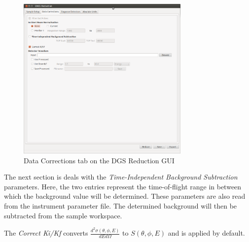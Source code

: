 \begin{figure}[ht]
\centerline{\includegraphics[width=0.75\textwidth]{figures/DataCorrections.png}}
\caption{Data Corrections tab on the DGS Reduction GUI}
\label{fig:DataCorr}
\end{figure}

The next section is deals with the \textit{Time-Independent Background Subtraction} parameters. Here, the two entries represent the time-of-flight range in between which the background value will be determined. These parameters are also read from the instrument parameter file. The determined background will then be subtracted from the sample workspace. 

The \textit{Correct Ki/Kf} converts $\frac{d^2\sigma(\theta,\phi,E)}{dE d\Omega}$ to $S(\theta, \phi, E)$ and is applied by default. 


